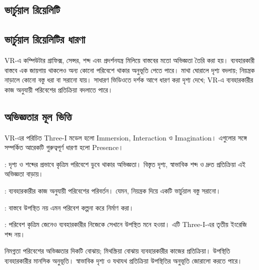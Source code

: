 \begin{topicbody}
\section{ভার্চুয়াল রিয়েলিটি}
\label{sec:ch1-vr}
\subsection{ভার্চুয়াল রিয়েলিটির ধারণা}
VR-এ কম্পিউটার গ্রাফিক্স, সেন্সর, শব্দ এবং প্রদর্শনযন্ত্র মিলিয়ে বাস্তবের মতো অভিজ্ঞতা তৈরি করা হয়। ব্যবহারকারী বাস্তবে এক জায়গায় থাকলেও অন্য কোনো পরিবেশে থাকার অনুভূতি পেতে পারে। মাথা ঘোরালে দৃশ্য বদলায়; নিয়ন্ত্রক নাড়ালে কোনো বস্তু ধরা বা সরানো যায়। সাধারণ ভিডিওতে দর্শক আগে ধারণ করা দৃশ্য দেখে; VR-এ ব্যবহারকারীর কাজ অনুযায়ী পরিবেশের প্রতিক্রিয়া বদলাতে পারে।
\subsection{অভিজ্ঞতার মূল ভিত্তি}
VR-এর পরিচিত Three-I মডেল হলো Immersion, Interaction ও Imagination। এগুলোর সঙ্গে সম্পর্কিত আরেকটি গুরুত্বপূর্ণ ধারণা হলো Presence।
\begin{compactpoints}
\item {}: দৃশ্য ও শব্দের প্রভাবে কৃত্রিম পরিবেশে ডুবে থাকার অভিজ্ঞতা। বিস্তৃত দৃশ্য, স্বাভাবিক শব্দ ও দ্রুত প্রতিক্রিয়া এই অভিজ্ঞতা বাড়ায়।
\item {}: ব্যবহারকারীর কাজ অনুযায়ী পরিবেশের পরিবর্তন। যেমন, নিয়ন্ত্রক দিয়ে একটি ভার্চুয়াল বস্তু সরানো।
\item {}: বাস্তবে উপস্থিত নয় এমন পরিবেশ কল্পনা করে নির্মাণ করা।
\item {}: পরিবেশ কৃত্রিম জেনেও ব্যবহারকারীর নিজেকে সেখানে উপস্থিত মনে হওয়া। এটি Three-I-এর তৃতীয় ইংরেজি শব্দ নয়।
\end{compactpoints}
নিমগ্নতা পরিবেশের অভিজ্ঞতার দিকটি বোঝায়; মিথস্ক্রিয়া বোঝায় ব্যবহারকারীর কাজের প্রতিক্রিয়া। উপস্থিতি ব্যবহারকারীর মানসিক অনুভূতি। স্বাভাবিক দৃশ্য ও যথাযথ প্রতিক্রিয়া উপস্থিতির অনুভূতি জোরালো করতে পারে।

\end{topicbody}
